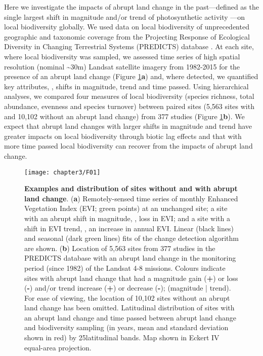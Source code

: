 Here we investigate the impacts of abrupt land change in the past—defined as the single largest shift in magnitude and/or trend of photosynthetic activity \citep{Verbesselt2010a,DeJong2013,Song2018}—on local biodiversity globally. We used data on local biodiversity of unprecedented geographic and taxonomic coverage from the Projecting Response of Ecological Diversity in Changing Terrestrial Systems (PREDICTS) database \citep{Hudson2016}. At each site, where local biodiversity was sampled, we assessed time series of high spatial resolution (nominal \textasciitilde30m) Landsat satellite imagery from 1982-2015 for the presence of an abrupt land change (Figure \ref{F03_01}\textbf{a}) and, where detected, we quantified key attributes, \ie, shifts in magnitude, trend and time passed. Using hierarchical analyses, we compared four measures of local biodiversity (species richness, total abundance, evenness and species turnover) between paired sites (5,563 sites with and 10,102 without an abrupt land change) from 377 studies (Figure \ref{F03_01}\textbf{b}). We expect that abrupt land changes with larger shifts in magnitude and trend have greater impacts on local biodiversity through biotic lag effects and that with more time passed local biodiversity can recover from the impacts of abrupt land change.

\begin{figure}[h]
\centering
\texttt{[image: chapter3/F01]}
\caption{ \textbf{Examples and distribution of sites without and with abrupt land change}. (\textbf{a}) Remotely-sensed time series of monthly Enhanced Vegetation Index (EVI; green points) at an unchanged site; a site with an abrupt shift in magnitude, \ie, loss in EVI; and a site with a shift in EVI trend, \ie, an increase in annual EVI. Linear (black lines) and seasonal (dark green lines) fits of the change detection algorithm \citep{Verbesselt2010a} are shown. (\textbf{b}) Location of 5,563 sites from 377 studies in the PREDICTS database with an abrupt land change in the monitoring period (since 1982) of the Landsat 4-8 missions. Colours indicate sites with abrupt land change that had a magnitude gain (\textbf{+}) or loss (\textbf{-}) and/or trend increase (\textbf{+}) or decrease (\textbf{-}); (magnitude | trend). For ease of viewing, the location of 10,102 sites without an abrupt land change has been omitted. Latitudinal distribution of sites with an abrupt land change and time passed between abrupt land change and biodiversity sampling (in years, mean and standard deviation shown in red) by 25\textdegree  latitudinal bands. Map shown in Eckert IV equal-area projection.}
\label{F03_01}
\end{figure}

